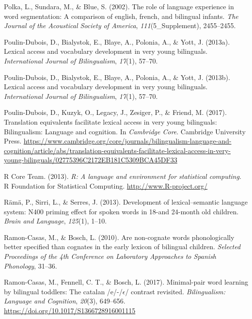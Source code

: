 \documentclass[
  12pt,
  b5paperpaper,
  twoside]{scrreprt}
\newlength{\cslhangindent}
\newlength{\cslentryspacingunit} %
\newenvironment{CSLReferences}[2] %
 {%
  \setlength{\parindent}{0pt}
  \ifodd #1
  \let\oldpar\par
  \def\par{\hangindent=\cslhangindent\oldpar}
  \fi
  \setlength{\parskip}{#2\cslentryspacingunit}
 }%
 {}
\begin{document}
\begin{CSLReferences}{1}{0}
\leavevmode{}%
Polka, L., Sundara, M., \& Blue, S. (2002). The role of language
experience in word segmentation: A comparison of english, french, and
bilingual infants. \emph{The Journal of the Acoustical Society of
America}, \emph{111}(5\_Supplement), 2455--2455.

\leavevmode{}%
Poulin-Dubois, D., Bialystok, E., Blaye, A., Polonia, A., \& Yott, J.
(2013a). Lexical access and vocabulary development in very young
bilinguals. \emph{International Journal of Bilingualism}, \emph{17}(1),
57--70.

\leavevmode{}%
Poulin-Dubois, D., Bialystok, E., Blaye, A., Polonia, A., \& Yott, J.
(2013b). Lexical access and vocabulary development in very young
bilinguals. \emph{International Journal of Bilingualism}, \emph{17}(1),
57--70.

\leavevmode{}%
Poulin-Dubois, D., Kuzyk, O., Legacy, J., Zesiger, P., \& Friend, M.
(2017). Translation equivalents facilitate lexical access in very young
bilinguals: Bilingualism: Language and cognition. In \emph{Cambridge
Core}. Cambridge University Press.
\url{https://www.cambridge.org/core/journals/bilingualism-language-and-cognition/article/abs/translation-equivalents-facilitate-lexical-access-in-very-young-bilinguals/02775396C2172EB181C5309BCA45DF33}

\leavevmode{}%
R Core Team. (2013). \emph{R: A language and environment for statistical
computing}. R Foundation for Statistical Computing.
\url{http://www.R-project.org/}

\leavevmode{}%
Rämä, P., Sirri, L., \& Serres, J. (2013). Development of
lexical--semantic language system: N400 priming effect for spoken words
in 18-and 24-month old children. \emph{Brain and Language},
\emph{125}(1), 1--10.

\leavevmode{}%
Ramon-Casas, M., \& Bosch, L. (2010). Are non-cognate words
phonologically better specified than cognates in the early lexicon of
bilingual children. \emph{Selected Proceedings of the 4th Conference on
Laboratory Approaches to Spanish Phonology}, 31--36.

\leavevmode{}%
Ramon-Casas, M., Fennell, C. T., \& Bosch, L. (2017). Minimal-pair word
learning by bilingual toddlers: The catalan /e/-/{\(\epsilon\)}/
contrast revisited. \emph{Bilingualism: Language and Cognition},
\emph{20}(3), 649--656. \url{https://doi.org/10.1017/S1366728916001115}


\end{CSLReferences}
\end{document}
